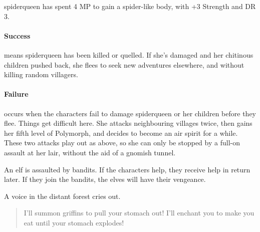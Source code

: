 \begin{multicols}{2}
\gnomishillusionist


\gnome


\gnome

\label{spiderqueen}


\Gls{spiderqueen} has spent 4 MP to gain a spider-like body, with +3 Strength and DR 3.

\chitincrawler

\paragraph{Success} means \gls{spiderqueen} has been killed or quelled.
If she's damaged and her chitinous children pushed back, she flees to seek new adventures elsewhere, and without killing random villagers.

\paragraph{Failure} occurs when the characters fail to damage \gls{spiderqueen} or her children before they flee.
Things get difficult here.
She attacks neighbouring villages twice, then gains her fifth level of Polymorph, and decides to become an air spirit for a while.
These two attacks play out as above, so she can only be stopped by a full-on assault at her lair, without the aid of a gnomish tunnel.

\label{littleprince}

\sqminitoc

An elf is assaulted by bandits.
If the characters help, they receive help in return later.
If they join the bandits, the elves will have their vengeance.


\begin{boxtext}
	A voice in the distant forest cries out.
	\begin{quote}
		I'll summon griffins to pull your stomach out!  I'll enchant you to make you eat until your stomach explodes!
	\end{quote}


\end{boxtext}
\end{multicols}
